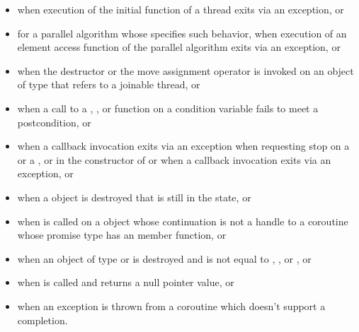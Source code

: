 \begin{note}
\begin{itemize}
\item%
when execution of the initial function of a thread exits via
an exception, or

\item%
for a parallel algorithm whose  specifies such
behavior,
when execution of an element access function
of the parallel algorithm exits via an exception, or

\item%
when the destructor or the move assignment operator is invoked on an object
of type  that refers to
a joinable thread, or

\item%
when a call to a , , or 
function on a condition variable
fails to meet a postcondition, or

\item%
when a callback invocation exits via an exception
when requesting stop on
a  or
a ,
or in the constructor of
 or
when a callback invocation exits via an exception, or

\item%
when a  object is destroyed
that is still in the  state, or

\item%
when  is called on
a  object
whose continuation is not a handle to a coroutine
whose promise type has an  member function, or

\item%
when an object  of type
 or
is destroyed and
 is not equal to
,
, or
, or

\item%
when  is called and
returns a null pointer value, or

\item%
when an exception is thrown from a coroutine 
which doesn't support a  completion.
\end{itemize}
\end{note}

